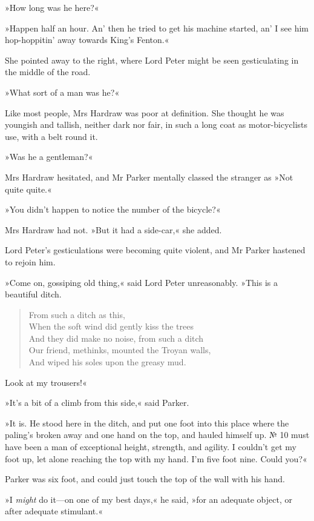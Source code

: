 »How long was he here?«

»Happen half an hour. An' then he tried to get his machine started, an' I see him hop-hoppitin' away towards King's Fenton.«

She pointed away to the right, where Lord Peter might be seen gesticulating in the middle of the road.

»What sort of a man was he?«

Like most people, Mrs Hardraw was poor at definition. She thought he was youngish and tallish, neither dark nor fair, in such a long coat as motor-bicyclists use, with a belt round it.

»Was he a gentleman?«

Mrs Hardraw hesitated, and Mr Parker mentally classed the stranger as »Not quite quite.«

»You didn't happen to notice the number of the bicycle?«

Mrs Hardraw had not. »But it had a side-car,« she added.

Lord Peter's gesticulations were becoming quite violent, and Mr Parker hastened to rejoin him.

»Come on, gossiping old thing,« said Lord Peter unreasonably. »This is a beautiful ditch.

\begin{verse}
From such a ditch as this,\\
When the soft wind did gently kiss the trees\\
And they did make no noise, from such a ditch\\
Our friend, methinks, mounted the Troyan walls,\\
And wiped his soles upon the greasy mud.\\
\end{verse}

Look at my trousers!«

»It's a bit of a climb from this side,« said Parker.

»It is. He stood here in the ditch, and put one foot into this place where the paling's broken away and one hand on the top, and hauled himself up. № 10 must have been a man of exceptional height, strength, and agility. I couldn't get my foot up, let alone reaching the top with my hand. I'm five foot nine. Could you?«

Parker was six foot, and could just touch the top of the wall with his hand.

»I \textit{might} do it\allowbreak---\allowbreak on one of my best days,« he said, »for an adequate object, or after adequate stimulant.«

